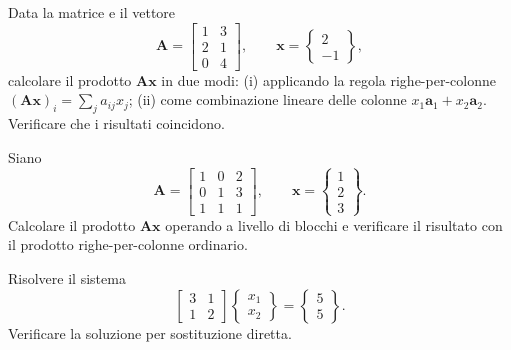 \begin{esercizio} 
	Data la matrice e il vettore
	\begin{equation*}
		\bm{A} = \begin{bmatrix} 1 & 3 \\ 2 & 1 \\ 0 & 4 \end{bmatrix},
		\qquad
		\bm{x} = \begin{Bmatrix} 2 \\ -1 \end{Bmatrix},
	\end{equation*}
	calcolare il prodotto $\bm{A}\bm{x}$ in due modi: (i) applicando
	la regola righe-per-colonne $(\bm{A}\bm{x})_i = \sum_j a_{ij}x_j$;
	(ii) come combinazione lineare delle colonne
	$x_1\bm{a}_1+x_2\bm{a}_2$. Verificare che i risultati coincidono.
\end{esercizio} 

\begin{esercizio} 
	Siano
	\begin{equation*}
		\bm{A} = \left[\begin{array}{cc|c}
			1 & 0 & 2 \\
			0 & 1 & 3 \\ \hline
			1 & 1 & 1
		\end{array}\right],
		\qquad
		\bm{x} = \left\{\begin{array}{c}
			1 \\ 2 \\ \hline 3
		\end{array}\right\}.
	\end{equation*}
	Calcolare il prodotto $\bm{A}\bm{x}$ operando a livello di blocchi
	e verificare il risultato con il prodotto righe-per-colonne ordinario.
\end{esercizio} 

\begin{esercizio} 
	Risolvere il sistema
	\begin{equation*}
		\begin{bmatrix} 3 & 1 \\ 1 & 2 \end{bmatrix}
		\begin{Bmatrix} x_1 \\ x_2 \end{Bmatrix}
		= \begin{Bmatrix} 5 \\ 5 \end{Bmatrix}.
	\end{equation*}
	Verificare la soluzione per sostituzione diretta.
\end{esercizio} 

